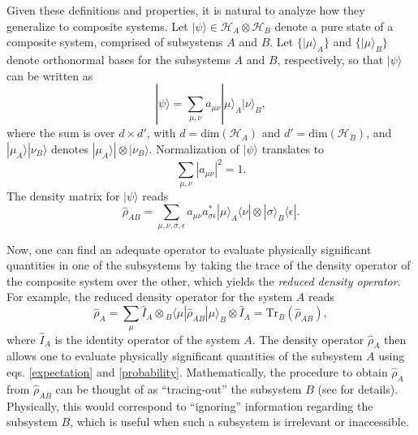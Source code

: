 \documentclass[
12pt,		%
openright,	%
twoside,  %
a4paper,			%
chapter=TITLE,		%
english,			%
french,				%
spanish,			%
brazil				%
]{USPSC-classe/USPSC}
\begin{document}
\begin{apendicesenv}
Given these definitions and properties, it is natural to analyze how they generalize to composite systems. Let $|\psi\rangle\in\mathscr{H}_A\otimes\mathscr{H}_B$ denote a pure state of a composite system, comprised of subsystems $A$ and $B$. Let $\{|{\mu}\rangle_A\}$ and $\{|{\mu}\rangle_B\}$ denote orthonormal bases for the subsystems $A$ and $B$, respectively, so that $|\psi\rangle$ can be written as
\begin{equation}\label{ent12345}
    |\psi\rangle=\sum_{\mu,\nu}a_{\mu\nu}|{\mu}\rangle_A|{\nu}\rangle_B,
\end{equation}
where the sum is over $d\times d'$, with $d=\text{dim}(\mathscr{H}_A)$ and $d'=\text{dim}(\mathscr{H}_B)$, and $|{\mu}_A\rangle|{\nu}_B\rangle$ denotes $|{\mu}_A\rangle|\otimes|{\nu}_B\rangle$. Normalization of $|\psi\rangle$ translates to 
\begin{equation}
    \sum_{\mu,\nu}|a_{\mu\nu}|^2=1.
\end{equation}
The density matrix for $|\psi\rangle$ reads
\begin{equation}
    \hat{\rho}_{AB}=\sum_{\mu,\nu,\sigma,\epsilon}a_{\mu\nu}a^*_{\sigma\epsilon}|\mu\rangle_A\langle\nu|\otimes|\sigma\rangle_B\langle\epsilon|.
\end{equation}

Now, one can find an adequate operator to evaluate physically significant quantities in one of the subsystems by taking the trace of the density operator of the composite system over the other, which yields the \textit{reduced density operator}. For example, the reduced density operator for the system $A$ reads 
\begin{equation}
    \hat{\rho}_A=\sum_{\mu}\hat{I}_A\otimes{}_B\langle\mu|\hat{\rho}_{AB}|\mu\rangle_B\otimes\hat{I}_A=\text{Tr}_B(\hat{\rho}_{AB}),
    \end{equation}
where $\hat{I}_A$ is the identity operator of the system $A$. The density operator $\hat{\rho}_A$ then allows one to evaluate physically significant quantities of the subsystem $A$ using eqs. \ref{expectation} and \ref{probability}. Mathematically, the procedure to obtain $\hat{\rho}_A$ from $\hat{\rho}_{AB}$ can be thought of as ``tracing-out'' the subsystem $B$ (see \cite{Nielsen2010} for details). Physically, this would correspond to ``ignoring'' information regarding the subsystem $B$, which is useful when such a subsystem is irrelevant or inaccessible.


\end{apendicesenv}
\end{document}

